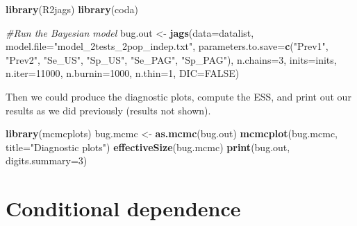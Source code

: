\documentclass[
]{book}
\newenvironment{Shaded}{\begin{snugshade}}{\end{snugshade}}
\newcommand{\AttributeTok}[1]{\textcolor[rgb]{0.13,0.29,0.53}{#1}}
\newcommand{\CommentTok}[1]{\textcolor[rgb]{0.56,0.35,0.01}{\textit{#1}}}
\newcommand{\ConstantTok}[1]{\textcolor[rgb]{0.56,0.35,0.01}{#1}}
\newcommand{\DecValTok}[1]{\textcolor[rgb]{0.00,0.00,0.81}{#1}}
\newcommand{\FunctionTok}[1]{\textcolor[rgb]{0.13,0.29,0.53}{\textbf{#1}}}
\newcommand{\NormalTok}[1]{#1}
\newcommand{\OtherTok}[1]{\textcolor[rgb]{0.56,0.35,0.01}{#1}}
\newcommand{\StringTok}[1]{\textcolor[rgb]{0.31,0.60,0.02}{#1}}
\begin{document}
\begin{Shaded}
\begin{Highlighting}[]
\FunctionTok{library}\NormalTok{(R2jags)}
\FunctionTok{library}\NormalTok{(coda)}

\CommentTok{\#Run the Bayesian model}
\NormalTok{bug.out }\OtherTok{\textless{}{-}} \FunctionTok{jags}\NormalTok{(}\AttributeTok{data=}\NormalTok{datalist,                             }
               \AttributeTok{model.file=}\StringTok{"model\_2tests\_2pop\_indep.txt"}\NormalTok{,     }
               \AttributeTok{parameters.to.save=}\FunctionTok{c}\NormalTok{(}\StringTok{"Prev1"}\NormalTok{, }\StringTok{"Prev2"}\NormalTok{, }\StringTok{"Se\_US"}\NormalTok{, }\StringTok{"Sp\_US"}\NormalTok{, }\StringTok{"Se\_PAG"}\NormalTok{, }\StringTok{"Sp\_PAG"}\NormalTok{),               }
               \AttributeTok{n.chains=}\DecValTok{3}\NormalTok{,                                 }
               \AttributeTok{inits=}\NormalTok{inits,                                }
               \AttributeTok{n.iter=}\DecValTok{11000}\NormalTok{,                                }
               \AttributeTok{n.burnin=}\DecValTok{1000}\NormalTok{,                              }
               \AttributeTok{n.thin=}\DecValTok{1}\NormalTok{,                                   }
               \AttributeTok{DIC=}\ConstantTok{FALSE}\NormalTok{)                                   }
\end{Highlighting}
\end{Shaded}

Then we could produce the diagnostic plots, compute the ESS, and print out our results as we did previously (results not shown).

\begin{Shaded}
\begin{Highlighting}[]
\FunctionTok{library}\NormalTok{(mcmcplots)}
\NormalTok{bug.mcmc }\OtherTok{\textless{}{-}} \FunctionTok{as.mcmc}\NormalTok{(bug.out)          }
\FunctionTok{mcmcplot}\NormalTok{(bug.mcmc, }\AttributeTok{title=}\StringTok{"Diagnostic plots"}\NormalTok{) }
\FunctionTok{effectiveSize}\NormalTok{(bug.mcmc)}
\FunctionTok{print}\NormalTok{(bug.out, }\AttributeTok{digits.summary=}\DecValTok{3}\NormalTok{) }
\end{Highlighting}
\end{Shaded}

\section{Conditional dependence}\label{conditional-dependence}
\end{document}
